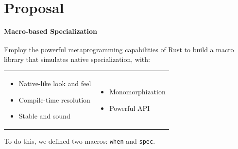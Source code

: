 \section{Proposal}\label{sec:proposal}

\begin{frame}{\secname}
	\framesubtitle{Macro-based Specialization}

	Employ the powerful metaprogramming capabilities of Rust to build a \alert{macro library} that simulates native specialization, with:

	\begin{tabular}{p{} p{}}
		\begin{itemize}
			\item Native-like look and feel %
			\item \alert{Compile-time resolution} %
			\item Stable and sound %
		\end{itemize}
		 &
		\begin{itemize}
			\item \alert{Monomorphization} %
			\item Powerful API %
		\end{itemize}
	\end{tabular}

	\smallskip

	To do this, we defined two macros:
	\texttt{when} %
	and \texttt{spec}. %
\end{frame}